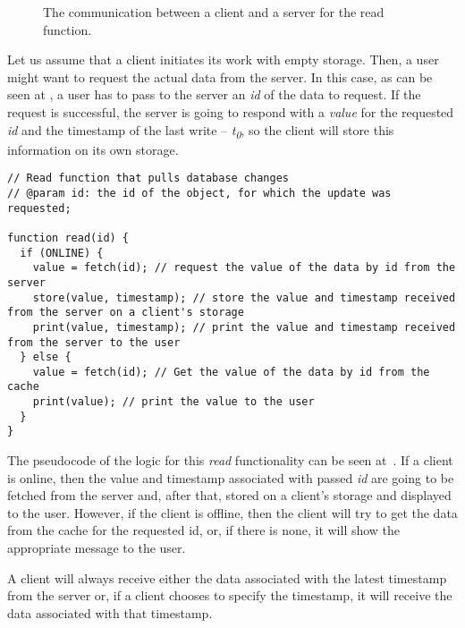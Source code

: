 \begin{figure}[!htb]
    \begin{center}
    \def\svgwidth{\linewidth}
    
    \caption {The communication between a client and a server for the read function.}
    \label{fig:design2}
\end{center}
\end{figure}

Let us assume that a client initiates its work with empty storage. Then, a user might want to request the actual data from the server. In this case, as can be seen at , a user has to pass to the server an \textit{id} of the data to request. If the request is successful, the server is going to respond with a \textit{value} for the requested \textit{id} and the timestamp of the last write -- \textit{t\textsubscript{0}}, so the client will store this information on its own storage.

\begin{lstlisting}[caption={A pseudocode for requesting the data.}, label={lst:read1}]
// Read function that pulls database changes
// @param id: the id of the object, for which the update was requested;

function read(id) {
  if (ONLINE) {
    value = fetch(id); // request the value of the data by id from the server
    store(value, timestamp); // store the value and timestamp received from the server on a client's storage
    print(value, timestamp); // print the value and timestamp received from the server to the user
  } else {
    value = fetch(id); // Get the value of the data by id from the cache
    print(value); // print the value to the user
  }
}
\end{lstlisting} 

The pseudocode of the logic for this \textit{read} functionality can be seen at~. If a client is online, then the value and timestamp associated with passed \textit{id} are going to be fetched from the server and, after that, stored on a client's storage and displayed to the user. However, if the client is offline, then the client will try to get the data from the cache for the requested id, or, if there is none, it will show the appropriate message to the user.

A client will always receive either the data associated with the latest timestamp from the server or, if a client chooses to specify the timestamp, it will receive the data associated with that timestamp. 

